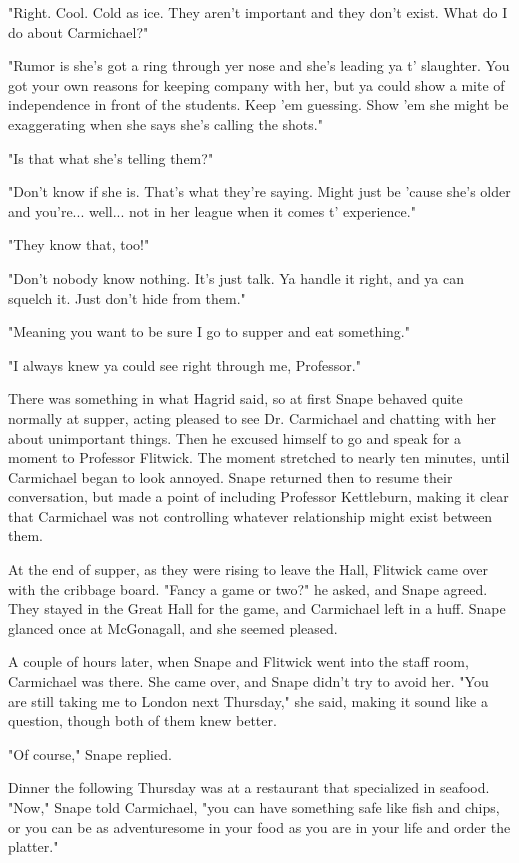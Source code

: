 \documentclass[a4paper,11pt]{article}
\begin{document}
"Right. Cool. Cold as ice. They aren't important and they don't exist. What do I do about Carmichael?"

"Rumor is she's got a ring through yer nose and she's leading ya t' slaughter. You got your own reasons for keeping company with her, but ya could show a mite of independence in front of the students. Keep 'em guessing. Show 'em she might be exaggerating when she says she's calling the shots."

"Is that what she's telling them?"

"Don't know if she is. That's what they're saying. Might just be 'cause she's older and you're... well... not in her league when it comes t' experience."

"They know that, too!"

"Don't nobody know nothing. It's just talk. Ya handle it right, and ya can squelch it. Just don't hide from them."

"Meaning you want to be sure I go to supper and eat something."

"I always knew ya could see right through me, Professor."

There was something in what Hagrid said, so at first Snape behaved quite normally at supper, acting pleased to see Dr. Carmichael and chatting with her about unimportant things. Then he excused himself to go and speak for a moment to Professor Flitwick. The moment stretched to nearly ten minutes, until Carmichael began to look annoyed. Snape returned then to resume their conversation, but made a point of including Professor Kettleburn, making it clear that Carmichael was not controlling whatever relationship might exist between them.

At the end of supper, as they were rising to leave the Hall, Flitwick came over with the cribbage board. "Fancy a game or two?" he asked, and Snape agreed. They stayed in the Great Hall for the game, and Carmichael left in a huff. Snape glanced once at McGonagall, and she seemed pleased.

A couple of hours later, when Snape and Flitwick went into the staff room, Carmichael was there. She came over, and Snape didn't try to avoid her. "You are still taking me to London next Thursday," she said, making it sound like a question, though both of them knew better.

"Of course," Snape replied.

Dinner the following Thursday was at a restaurant that specialized in seafood. "Now," Snape told Carmichael, "you can have something safe like fish and chips, or you can be as adventuresome in your food as you are in your life and order the platter."
\end{document}

